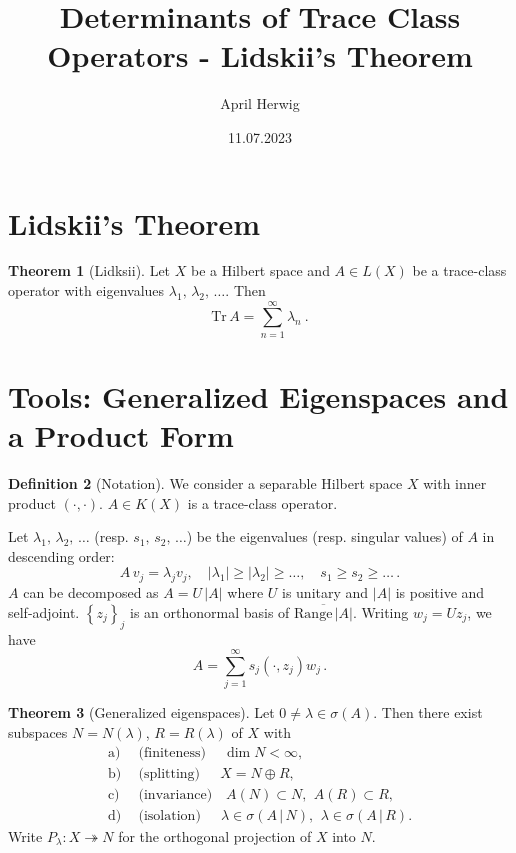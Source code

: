 \documentclass[a4paper, 10pt]{article}
\title{\vspace*{-5ex}Determinants of Trace Class Operators - Lidskii's Theorem}
\author{\vspace*{-15ex}April Herwig}
\date{11.07.2023}
\newcommand{\Tr}{\textrm{Tr}\,}
\newcommand{\ran}{\textrm{Range}\,}
\theoremstyle{definition}
\newtheorem{definition}{Definition}[section]
\newtheorem{theorem}[definition]{Theorem}
\theoremstyle{remark}
\theoremstyle{remark}
\begin{document}
\maketitle

\section{Lidskii's Theorem}

\begin{theorem}[Lidksii]
    \label{lidskii}
    Let $X$ be a Hilbert space and $A \in L(X)$ be a trace-class operator with eigenvalues $\lambda_1,\, \lambda_2,\, \ldots$. Then 
    \begin{equation}
        \Tr A = \sum_{n=1}^{\infty} \lambda_n\ . 
    \end{equation}
\end{theorem}

\section{Tools: Generalized Eigenspaces and a Product Form}

\begin{definition}[Notation]
    We consider a separable Hilbert space $X$ with inner product $(\cdot, \cdot)$. $A \in K(X)$ is a trace-class operator. 

    Let $\lambda_1,\, \lambda_2,\, \ldots$ (resp. $s_1,\, s_2,\, \ldots$) be the eigenvalues (resp. singular values) of $A$ in descending order:
    \begin{equation}
        A\, v_j = \lambda_j v_j, \quad |\lambda_1| \geq |\lambda_2| \geq \ldots, \quad s_1 \geq s_2 \geq \ldots\, .
    \end{equation}
    $A$ can be decomposed as $A = U\, |A|$ where $U$ is unitary and $|A|$ is positive and self-adjoint. $\left\{ z_j \right\}_j$ is an orthonormal basis of $\overline{\ran |A|}$. Writing $w_j = U z_j$, we have
    \begin{equation}
        A = \sum_{j=1}^\infty s_j (\cdot, z_j) w_j \,. 
    \end{equation}
\end{definition}

\begin{theorem}[Generalized eigenspaces]
    Let $0 \neq \lambda \in \sigma (A)$. Then there exist subspaces $N = N(\lambda)$, $R = R(\lambda)$ of $X$ with
    \begin{align}
        \text{a)}\ &\ \text{(finiteness)} \quad\ \dim N < \infty, \\
        \text{b)}\ &\ \text{(splitting)} \quad\ \ X = N \oplus R, \\
        \text{c)}\ &\ \text{(invariance)} \quad A(N) \subset N,\,\ A(R) \subset R, \\
        \text{d)}\ &\ \text{(isolation)} \quad\ \ \lambda \in \sigma (A \,\vert\, N),\,\ \lambda \in \sigma (A \,\vert\, R). 
    \end{align}
    Write $P_\lambda : X \twoheadrightarrow N$ for the orthogonal projection of $X$ into $N$. 
\end{theorem}
\end{document}
